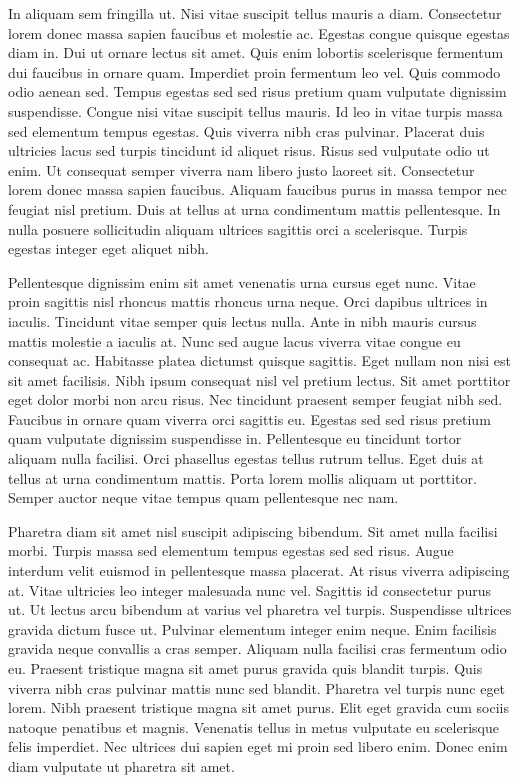 \documentclass[11pt,a4paper]{article}
\begin{document}
In aliquam sem fringilla ut. Nisi vitae suscipit tellus mauris a diam. Consectetur lorem donec massa sapien faucibus et molestie ac. Egestas congue quisque egestas diam in. Dui ut ornare lectus sit amet. Quis enim lobortis scelerisque fermentum dui faucibus in ornare quam. Imperdiet proin fermentum leo vel. Quis commodo odio aenean sed. Tempus egestas sed sed risus pretium quam vulputate dignissim suspendisse. Congue nisi vitae suscipit tellus mauris. Id leo in vitae turpis massa sed elementum tempus egestas. Quis viverra nibh cras pulvinar. Placerat duis ultricies lacus sed turpis tincidunt id aliquet risus. Risus sed vulputate odio ut enim. Ut consequat semper viverra nam libero justo laoreet sit. Consectetur lorem donec massa sapien faucibus. Aliquam faucibus purus in massa tempor nec feugiat nisl pretium. Duis at tellus at urna condimentum mattis pellentesque. In nulla posuere sollicitudin aliquam ultrices sagittis orci a scelerisque. Turpis egestas integer eget aliquet nibh.

Pellentesque dignissim enim sit amet venenatis urna cursus eget nunc. Vitae proin sagittis nisl rhoncus mattis rhoncus urna neque. Orci dapibus ultrices in iaculis. Tincidunt vitae semper quis lectus nulla. Ante in nibh mauris cursus mattis molestie a iaculis at. Nunc sed augue lacus viverra vitae congue eu consequat ac. Habitasse platea dictumst quisque sagittis. Eget nullam non nisi est sit amet facilisis. Nibh ipsum consequat nisl vel pretium lectus. Sit amet porttitor eget dolor morbi non arcu risus. Nec tincidunt praesent semper feugiat nibh sed. Faucibus in ornare quam viverra orci sagittis eu. Egestas sed sed risus pretium quam vulputate dignissim suspendisse in. Pellentesque eu tincidunt tortor aliquam nulla facilisi. Orci phasellus egestas tellus rutrum tellus. Eget duis at tellus at urna condimentum mattis. Porta lorem mollis aliquam ut porttitor. Semper auctor neque vitae tempus quam pellentesque nec nam.

Pharetra diam sit amet nisl suscipit adipiscing bibendum. Sit amet nulla facilisi morbi. Turpis massa sed elementum tempus egestas sed sed risus. Augue interdum velit euismod in pellentesque massa placerat. At risus viverra adipiscing at. Vitae ultricies leo integer malesuada nunc vel. Sagittis id consectetur purus ut. Ut lectus arcu bibendum at varius vel pharetra vel turpis. Suspendisse ultrices gravida dictum fusce ut. Pulvinar elementum integer enim neque. Enim facilisis gravida neque convallis a cras semper. Aliquam nulla facilisi cras fermentum odio eu. Praesent tristique magna sit amet purus gravida quis blandit turpis. Quis viverra nibh cras pulvinar mattis nunc sed blandit. Pharetra vel turpis nunc eget lorem. Nibh praesent tristique magna sit amet purus. Elit eget gravida cum sociis natoque penatibus et magnis. Venenatis tellus in metus vulputate eu scelerisque felis imperdiet. Nec ultrices dui sapien eget mi proin sed libero enim. Donec enim diam vulputate ut pharetra sit amet.
\end{document}
